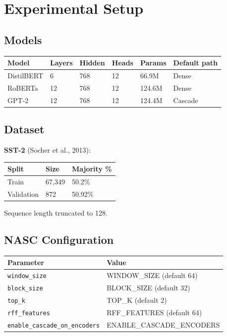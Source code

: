 
\section{Experimental Setup}

\subsection{Models}

\begin{table}[H]
\centering
\small
\begin{tabular}{llllll}
\toprule
\textbf{Model} & \textbf{Layers} & \textbf{Hidden} & \textbf{Heads} & \textbf{Params} & \textbf{Default path} \\
\midrule
DistilBERT & 6 & 768 & 12 & 66.9M & Dense \\
RoBERTa & 12 & 768 & 12 & 124.6M & Dense \\
GPT-2 & 12 & 768 & 12 & 124.4M & Cascade \\
\bottomrule
\end{tabular}
\end{table}

\subsection{Dataset}

\textbf{SST-2} (Socher et al., 2013):

\begin{table}[H]
\centering
\small
\begin{tabular}{lll}
\toprule
\textbf{Split} & \textbf{Size} & \textbf{Majority \%} \\
\midrule
Train & 67,349 & 50.2\% \\
Validation & 872 & 50.92\% \\
\bottomrule
\end{tabular}
\end{table}

Sequence length truncated to 128.

\subsection{NASC Configuration}

\begin{table}[H]
\centering
\small
\begin{tabular}{ll}
\toprule
\textbf{Parameter} & \textbf{Value} \\
\midrule
\texttt{window\_size} & {{WINDOW\_SIZE}} (default 64) \\
\texttt{block\_size} & {{BLOCK\_SIZE}} (default 32) \\
\texttt{top\_k} & {{TOP\_K}} (default 2) \\
\texttt{rff\_features} & {{RFF\_FEATURES}} (default 64) \\
\texttt{enable\_cascade\_on\_encoders} & {{ENABLE\_CASCADE\_ENCODERS}} \\
\bottomrule
\end{tabular}
\end{table}

